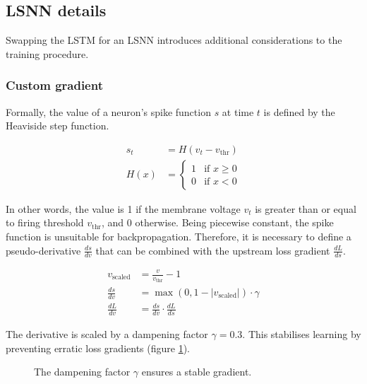 \documentclass[../../report.tex]{subfiles}
\begin{document}
\subsection{LSNN details}

Swapping the LSTM for an LSNN introduces additional considerations to the
training procedure.

\subsubsection{Custom gradient}
Formally, the value of a neuron's spike function \(s\) at time \(t\) is defined
by the Heaviside step function.

\begin{align*}
  s_t &= H(v_t - v_\mathrm{thr})
  \\
  H(x) &=
  \begin{cases}
  1 & \text{if } x \geq 0 \\
  0 & \text{if } x < 0
  \end{cases}
\end{align*}

In other words, the value is 1 if the membrane voltage \(v_t\) is greater than
or equal to firing threshold \(v_\mathrm{thr}\), and 0 otherwise. Being
piecewise constant, the spike function is unsuitable for backpropagation.
Therefore, it is necessary to define a pseudo-derivative \(\frac{ds}{dv}\) that
can be combined with the upstream loss gradient \(\frac{dL}{ds}\).

\begin{align*}
  v_\mathrm{scaled} &= \frac{v}{v_\mathrm{thr}} - 1
  \\
  \frac{ds}{dv} &= \max(0, 1 - \left| v_\mathrm{scaled} \right|) \cdot \gamma
  \\
  \frac{dL}{dv} &= \frac{ds}{dv} \cdot \frac{dL}{ds}
\end{align*}

The derivative is scaled by a dampening factor \(\gamma = 0.3\). This stabilises
learning by preventing erratic loss gradients (figure \ref{fig:dampening}).

\begin{figure}
  \centering
  \caption{The dampening factor \(\gamma\) ensures a stable gradient.}
  \label{fig:dampening}
\end{figure}
\end{document}
